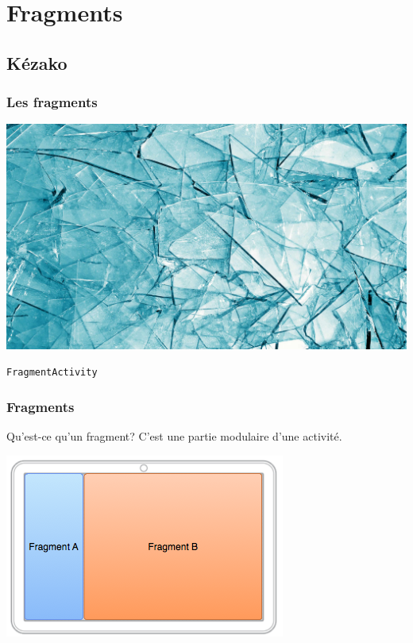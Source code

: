 \documentclass{beamer}
\begin{document}
\section{Fragments}

\subsection{Kézako}
\begin{frame}
\frametitle{Les fragments}

\begin{center}
\includegraphics[scale=0.165]{fragments_glass.jpg}
\end{center}

\begin{block}{}
\begin{center}
\verb!FragmentActivity!
\end{center}
\end{block}
\end{frame}

\begin{frame}
\frametitle{Fragments}
\begin{block}{Qu'est-ce qu'un fragment?}
C'est une partie modulaire d'une activité.
\end{block}

\begin{center}
\includegraphics[scale=0.5]{fragments-screen-tab.png}
\end{center}
\end{frame}
\end{document}
